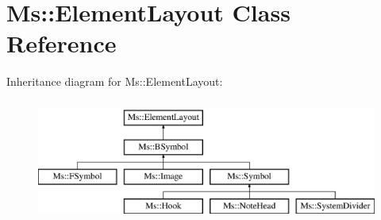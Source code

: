 \hypertarget{class_ms_1_1_element_layout}{}\section{Ms\+:\+:Element\+Layout Class Reference}
\label{class_ms_1_1_element_layout}
Inheritance diagram for Ms\+:\+:Element\+Layout\+:\begin{figure}[H]
\begin{center}
\leavevmode
\includegraphics[height=4.000000cm]{class_ms_1_1_element_layout}
\end{center}
\end{figure}
